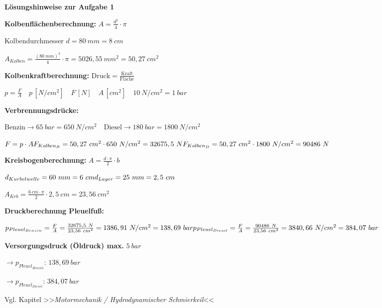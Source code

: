 \textbf{Lösungshinweise zur Aufgabe 1}

\textbf{Kolbenflächenberechnung:}
$\boxed{A = \frac{d^2}{4} \cdot \pi}$

Kolbendurchmesser $d = 80~mm = 8~cm$

$A_{Kolben} = \frac{(80~mm)^2}{4} \cdot \pi = 5026,55~mm^2 = 50,27~cm^2$

\textbf{Kolbenkraftberechnung:}
$\boxed{\text{Druck} = \frac{\text{Kraft}}{\text{Fläche}}}$

$\boxed{p = \frac{F}{A}} \quad \boxed{p\,[N/cm^2] \quad F\,[N] \quad A\,[cm^2]} \quad \boxed{10~N/cm^2 = 1~bar}$

\textbf{Verbrennungsdrücke:}

$\text{Benzin} \to 65~bar = 650~N/cm^2 \quad \text{Diesel} \to 180~bar = 1800~N/cm^2$

$F = p \cdot A \\ F_{Kolben_B} = 50,27~cm^2 \cdot 650~N/cm^2  = 32675,5~N \\ F_{Kolben_D} = 50,27~cm^2 \cdot 1800~N/cm^2  = 90486~N$

\textbf{Kreisbogenberechnung:}
$\boxed{A = \frac{d \cdot \pi}{2} \cdot b}$

$d_{Kurbelwelle} = 60~mm = 6~cm \\ d_{Lager} = 25~mm = 2,5~cm$

$A_{Krb} = \frac{6~cm \cdot \pi}{2} \cdot 2,5~cm  = 23,56~cm^2$

\textbf{Druckberechnung Pleuelfuß:}

$p_{Pleuel_{Benzin}} = \frac{F}{A}  = \frac{32675,5~N}{23,56~cm^2}  = 1386,91~N/cm^2  = 138,69~bar \\ p_{Pleuel_{Diesel}} = \frac{F}{A}  = \frac{90486~N}{23,56~cm^2}  = 3840,66~N/cm^2  = 384,07~bar$

\textbf{Versorgungsdruck (Öldruck) max.} $5~bar$

$\to p_{Pleuel_{Benzin}}:\,138,69~bar$

$\to p_{Pleuel_{Diesel}}:\,384,07~bar$

Vgl. Kapitel >>\emph{Motormechanik / Hydrodynamischer Schmierkeil}<<
